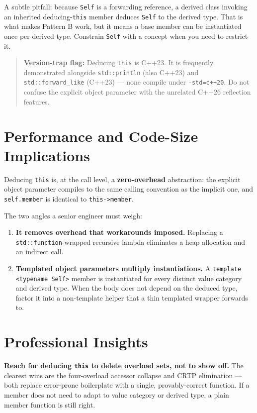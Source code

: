 A subtle pitfall: because \lstinline|Self| is a forwarding reference, a derived class invoking an inherited deducing-\lstinline|this| member deduces \lstinline|Self| to the derived type. That is what makes Pattern B work, but it means a base member can be instantiated once per derived type. Constrain \lstinline|Self| with a concept when you need to restrict it.

\begin{quote}
\textbf{Version-trap flag:} Deducing \lstinline|this| is C++23. It is frequently demonstrated alongside \lstinline|std::println| (also C++23) and \lstinline|std::forward_like| (C++23) --- none compile under \lstinline|-std=c++20|. Do not confuse the explicit object parameter with the unrelated C++26 reflection features.
\end{quote}

\section{Performance and Code-Size Implications}

Deducing \lstinline|this| is, at the call level, a \textbf{zero-overhead} abstraction: the explicit object parameter compiles to the same calling convention as the implicit one, and \lstinline|self.member| is identical to \lstinline|this->member|.

The two angles a senior engineer must weigh:

\begin{enumerate}
    \item \textbf{It removes overhead that workarounds imposed.} Replacing a \lstinline|std::function|-wrapped recursive lambda eliminates a heap allocation and an indirect call.
    \item \textbf{Templated object parameters multiply instantiations.} A \lstinline|template <typename Self>| member is instantiated for every distinct value category and derived type. When the body does not depend on the deduced type, factor it into a non-template helper that a thin templated wrapper forwards to.
\end{enumerate}

\section{Professional Insights}

\textbf{Reach for deducing \lstinline|this| to delete overload sets, not to show off.} The clearest wins are the four-overload accessor collapse and CRTP elimination --- both replace error-prone boilerplate with a single, provably-correct function. If a member does not need to adapt to value category or derived type, a plain member function is still right.

